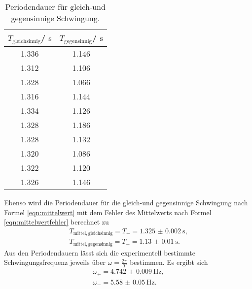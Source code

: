 \begin{table}
	\centering
	\caption{Periodendauer für gleich-und gegensinnige Schwingung.}
	\label{tab:gleichgegen}
	\begin{tabular}{cc}
		\toprule
		$T_{\mathrm{gleichsinnig}}$/ $\si{\second}$ & $T_{\mathrm{gegensinnig}}$/ $\si{\second}$ \\
		\midrule
		1.336                                       & 1.146                                      \\
		1.312                                       & 1.106                                      \\
		1.328                                       & 1.066                                      \\
		1.316                                       & 1.144                                      \\
		1.334                                       & 1.126                                      \\
		1.328                                       & 1.186                                      \\
		1.328                                       & 1.132                                      \\
		1.320                                       & 1.086                                      \\
		1.322                                       & 1.120                                      \\
		1.326                                       & 1.146                                      \\
		\bottomrule
	\end{tabular}
\end{table}
Ebenso wird die Periodendauer für die gleich-und gegensinnige Schwingung nach Formel \eqref{eqn:mittelwert} mit dem Fehler des Mittelwerts nach Formel \eqref{eqn:mittelwertfehler} berechnet zu
\begin{gather*}
	T_{\mathrm{mittel, gleichsinnig}}=T_{\mathrm{+}}=\SI{1.325(2)}{\second} \text{,}\\
	T_{\mathrm{mittel, gegensinnig}}=T_{\mathrm{-}} =\SI{1.13(1)}{\second} \text{.}
\end{gather*}
Aus den Periodendauern lässt sich die experimentell bestimmte Schwingungsfrequenz jeweils über $\omega=\frac{2\pi}{T}$ bestimmen.
Es ergibt sich
\begin{gather*}
	\omega_{\mathrm{+}}= \SI{4.742(9)}{\Hz} \text{,}\\
	\omega_{\mathrm{-}}= \SI{5.58(5)}{\Hz} \text{.}
\end{gather*}
